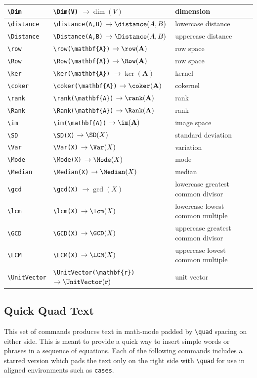 \documentclass[a4paper,12pt]{article}
\begin{document}
\begin{longtable}[c]{|L{0.2\textwidth}|L{0.35\textwidth}|L{0.35\textwidth}|}
\verb|\Dim| & \verb|\Dim(V)| $\rightarrow\dim(V)$ & dimension \\\hline
\verb|\distance| & \verb|\distance(A,B)| $\rightarrow\distance(A,B)$ & lowercase distance \\\hline
\verb|\Distance| & \verb|\Distance(A,B)| $\rightarrow\Distance(A,B)$ & uppercase distance \\\hline
\verb|\row| & \verb|\row(\mathbf{A})| $\rightarrow\row(\mathbf{A})$ & row space \\\hline
\verb|\Row| & \verb|\Row(\mathbf{A})| $\rightarrow\Row(\mathbf{A})$ & row space \\\hline
\verb|\ker| & \verb|\ker(\mathbf{A})| $\rightarrow\ker(\mathbf{A})$ & kernel \\\hline
\verb|\coker| & \verb|\coker(\mathbf{A})| $\rightarrow\coker(\mathbf{A})$ & cokernel \\\hline
\verb|\rank| & \verb|\rank(\mathbf{A})| $\rightarrow\rank(\mathbf{A})$ & rank \\\hline
\verb|\Rank| & \verb|\Rank(\mathbf{A})| $\rightarrow\Rank(\mathbf{A})$ & rank \\\hline
\verb|\im| & \verb|\im(\mathbf{A})| $\rightarrow\im(\mathbf{A})$ & image space \\\hline
\verb|\SD| & \verb|\SD(X)| $\rightarrow\SD(X)$ & standard deviation \\\hline
\verb|\Var| & \verb|\Var(X)| $\rightarrow\Var(X)$ & variation \\\hline
\verb|\Mode| & \verb|\Mode(X)| $\rightarrow\Mode(X)$ & mode \\\hline
\verb|\Median| & \verb|\Median(X)| $\rightarrow\Median(X)$ & median \\\hline
\verb|\gcd| & \verb|\gcd(X)| $\rightarrow\gcd(X)$ & lowercase greatest common divisor \\\hline
\verb|\lcm| & \verb|\lcm(X)| $\rightarrow\lcm(X)$ & lowercase lowest common multiple \\\hline
\verb|\GCD| & \verb|\GCD(X)| $\rightarrow\GCD(X)$ & uppercase greatest common divisor \\\hline
\verb|\LCM| & \verb|\LCM(X)| $\rightarrow\LCM(X)$ & uppercase lowest common multiple \\\hline
\verb|\UnitVector| & \verb|\UnitVector(\mathbf{r})| $\rightarrow\UnitVector(\mathbf{r})$ & unit vector \\\hline
\end{longtable}
\subsection{Quick Quad Text}
This set of commands produces text in math-mode padded by \verb|\quad| spacing on either side. This is meant to provide a quick way to insert simple words or phrases in a sequence of equations. Each of the following commands includes a starred version which pads the text only on the right side with \verb|\quad| for use in aligned environments such as \texttt{cases}.
\end{document}
